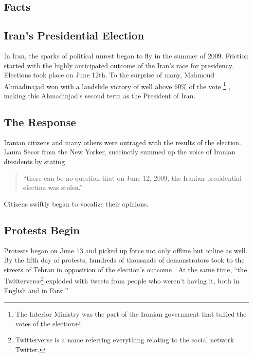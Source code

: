 \documentclass[11pt]{article}
\begin{document}
\begin{multicols}{2}
\setcounter{page}{1}
\section{Facts} 

\subsection{Iran's Presidential Election}

In Iran, the sparks of political unrest began to fly in the summer of 2009.
Friction started with the highly anticipated outcome of the Iran's race for
presidency. Elections took place on June 12th. To the surprise of many, Mahmoud
Ahmadinajad won with a landslide victory of well above 60\% of the vote
\footnote{The Interior Ministry was the part of the Iranian government that
tallied the votes of the election}  \cite{TheIranianVote,
IranianElectionResultsByProvince} , making this Ahmadinjad's second term as the
President of Iran.

\subsection{The Response}

Iranian citizens and many others were outraged with the results of the election.
Laura Secor from the New Yorker, succinctly summed up the voice of Iranian
dissidents by stating 
\begin{quotation} 
  ``there can be no question that on June 12, 2009, the Iranian presidential 
  election was stolen.'' \cite{TheIranianVote}
\end{quotation} 
Citizens swiftly began to vocalize their opinions.

\subsection{Protests Begin}

Protests began on June 13 and picked up force not only offline but online as
well. By the fifth day of protests, hundreds of thousands of demonstrators took to
the streets of Tehran in opposition of the election's outcome
\cite{IranProtestsFifthDayOfUnrest}. At the same time, ``the
Twitterverse\footnote{Twitterverse is a name referring everything relating to
the social network Twitter.} exploded with tweets from people who weren't having
it, both in English and in Farsi.'' \cite{WhyTwitterIsTheMedium}


\end{multicols}
\end{document}

